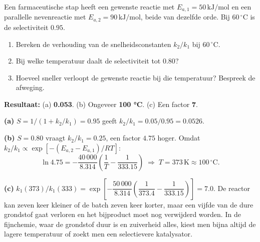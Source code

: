 \begin{oefening}
Een farmaceutische stap heeft een gewenste reactie met \(E_{a,1} = 50\,\mathrm{kJ/mol}\) en een parallelle nevenreactie met \(E_{a,2} = 90\,\mathrm{kJ/mol}\), beide van dezelfde orde. Bij \(60\,^\circ\mathrm{C}\) is de selectiviteit \(0.95\).

\begin{enumerate}
\item[(a)]
  Bereken de verhouding van de snelheidsconstanten \(k_2/k_1\) bij \(60\,^\circ\mathrm{C}\).
\item[(b)]
  Bij welke temperatuur daalt de selectiviteit tot \(0.80\)?
\item[(c)]
  Hoeveel sneller verloopt de gewenste reactie bij die temperatuur? Bespreek de afweging.
\end{enumerate}
\end{oefening}
\begin{oplossing}
\textbf{Resultaat:} (a) \textbf{0.053}. (b) Ongeveer \textbf{100 °C}. (c) Een factor \textbf{7}.

\textbf{(a)} \(S = 1/(1 + k_2/k_1) = 0.95\) geeft \(k_2/k_1 = 0.05/0.95 = 0.0526\).

\textbf{(b)} \(S = 0.80\) vraagt \(k_2/k_1 = 0.25\), een factor \(4.75\) hoger. Omdat \(k_2/k_1 \propto \exp[-(E_{a,2}-E_{a,1})/RT]\):
\[
\ln 4.75 = -\frac{40\,000}{8.314}\left(\frac{1}{T} - \frac{1}{333.15}\right) \;\Rightarrow\; T = 373\,\mathrm{K} \approx 100\,^\circ\mathrm{C}.
\]

\textbf{(c)} \(k_1(373)/k_1(333) = \exp\!\left[-\dfrac{50\,000}{8.314}\left(\dfrac{1}{373.4} - \dfrac{1}{333.15}\right)\right] = 7.0\). De reactor kan zeven keer kleiner of de batch zeven keer korter, maar een vijfde van de dure grondstof gaat verloren en het bijproduct moet nog verwijderd worden. In de fijnchemie, waar de grondstof duur is en zuiverheid alles, kiest men bijna altijd de lagere temperatuur of zoekt men een selectievere katalysator.
\end{oplossing}


